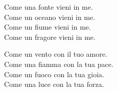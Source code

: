 
 

\spazio

\strofa Come una fonte vieni in me.\\
Come un oceano vieni in me.\\
Come un fiume vieni in me.\\
Come un fragore vieni in me.

\spazio


\spazio

\strofa Come un vento con il tuo amore.\\
Come una fiamma con la tua pace.\\
Come un fuoco con la tua gioia.\\
Come una luce con la tua forza.

\spazio


%
%
%
